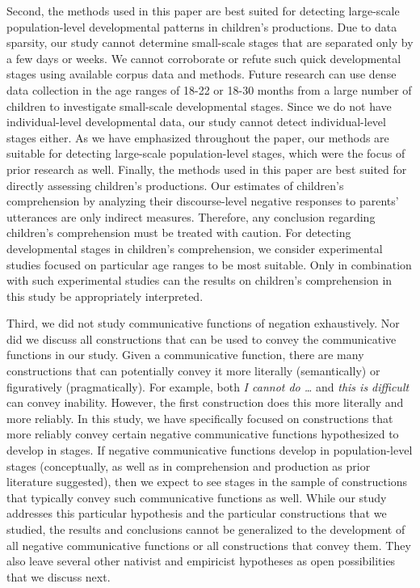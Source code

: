 \documentclass[
  man,floatsintext]{apa6}
\begin{document}
Second, the methods used in this paper are best suited for detecting large-scale population-level developmental patterns in children's productions. Due to data sparsity, our study cannot determine small-scale stages that are separated only by a few days or weeks. We cannot corroborate or refute such quick developmental stages using available corpus data and methods. Future research can use dense data collection in the age ranges of 18-22 or 18-30 months from a large number of children to investigate small-scale developmental stages. Since we do not have individual-level developmental data, our study cannot detect individual-level stages either. As we have emphasized throughout the paper, our methods are suitable for detecting large-scale population-level stages, which were the focus of prior research as well. Finally, the methods used in this paper are best suited for directly assessing children's productions. Our estimates of children's comprehension by analyzing their discourse-level negative responses to parents' utterances are only indirect measures. Therefore, any conclusion regarding children's comprehension must be treated with caution. For detecting developmental stages in children's comprehension, we consider experimental studies focused on particular age ranges to be most suitable. Only in combination with such experimental studies can the results on children's comprehension in this study be appropriately interpreted.

Third, we did not study communicative functions of negation exhaustively. Nor did we discuss all constructions that can be used to convey the communicative functions in our study. Given a communicative function, there are many constructions that can potentially convey it more literally (semantically) or figuratively (pragmatically). For example, both \emph{I cannot do \ldots{}} and \emph{this is difficult} can convey inability. However, the first construction does this more literally and more reliably. In this study, we have specifically focused on constructions that more reliably convey certain negative communicative functions hypothesized to develop in stages. If negative communicative functions develop in population-level stages (conceptually, as well as in comprehension and production as prior literature suggested), then we expect to see stages in the sample of constructions that typically convey such communicative functions as well. While our study addresses this particular hypothesis and the particular constructions that we studied, the results and conclusions cannot be generalized to the development of all negative communicative functions or all constructions that convey them. They also leave several other nativist and empiricist hypotheses as open possibilities that we discuss next.
\end{document}
